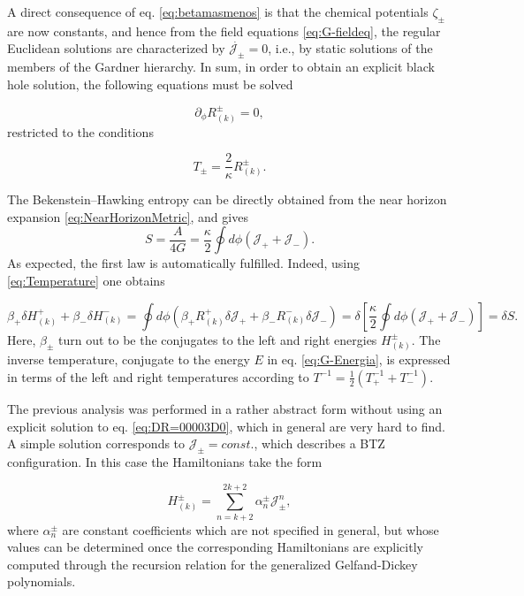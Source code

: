 \documentclass[letterpaper,11pt,oneside]{book}
\begin{document}
A direct consequence of eq. \eqref{eq:betamasmenos} is that the chemical
potentials $\zeta_{\pm}$ are now constants, and hence from the field
equations \eqref{eq:G-fieldeq}, the regular Euclidean solutions are
characterized by $\dot{\mathcal{J_{\pm}}}=0$, i.e., by static solutions
of the members of the Gardner hierarchy. In sum, in order to obtain
an explicit black hole solution, the following equations must be solved

\begin{equation}
	\partial_{\phi}R_{\left(k\right)}^{\pm}=0,\label{eq:DR=00003D0}
\end{equation}
restricted to the conditions

\begin{equation}
	T_{\pm}=\frac{2}{\kappa}R_{\left(k\right)}^{\pm}.\label{eq:Temperature}
\end{equation}

The Bekenstein--Hawking entropy can be directly obtained from the
near horizon expansion \eqref{eq:NearHorizonMetric}, and gives
\begin{equation}
	S=\frac{A}{4G}=\frac{\kappa}{2}\oint d\phi\left(\mathcal{J_{+}}+\mathcal{J_{-}}\right).\label{eq:HawkingBek-Entropy}
\end{equation}
As expected, the first law is automatically fulfilled. Indeed, using
\eqref{eq:Temperature} one obtains

\[
\beta_{+}\delta H_{\left(k\right)}^{+}+\beta_{-}\delta H_{\left(k\right)}^{-}=\oint d\phi\left(\beta_{+}R_{\left(k\right)}^{+}\delta\mathcal{J_{+}}+\beta_{-}R_{\left(k\right)}^{-}\delta\mathcal{J_{-}}\right)=\delta\left[\frac{\kappa}{2}\oint d\phi\left(\mathcal{J_{+}}+\mathcal{J_{-}}\right)\right]=\delta S.
\]
Here, $\beta_{\pm}$ turn out to be the conjugates to the left and
right energies $H_{\left(k\right)}^{\pm}$. The inverse temperature,
conjugate to the energy $E$ in eq. \eqref{eq:G-Energia}, is expressed
in terms of the left and right temperatures according to $T^{-1}=\frac{1}{2}\left(T_{+}^{-1}+T_{-}^{-1}\right)$.

The previous analysis was performed in a rather abstract form without
using an explicit solution to eq. \eqref{eq:DR=00003D0}, which in
general are very hard to find. A simple solution corresponds to $\mathcal{J_{\pm}}=const.$,
which describes a BTZ configuration. In this case the Hamiltonians
take the form

\[
H_{\left(k\right)}^{\pm}=\sum_{n=k+2}^{2k+2}\alpha_{n}^{\pm}\mathcal{J}_{\pm}^{n},
\]
where $\alpha_{n}^{\pm}$ are constant coefficients which are not
specified in general, but whose values can be determined once the
corresponding Hamiltonians are explicitly computed through the recursion
relation for the generalized Gelfand-Dickey polynomials.
\end{document}
